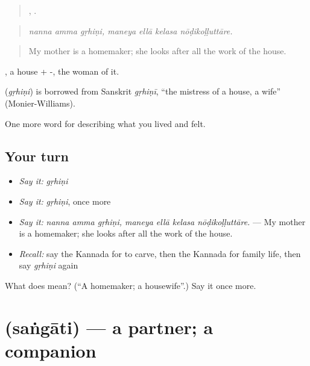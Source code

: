 \begin{quote}
  ,    .
\end{quote}

\begin{quote}
\emph{nanna amma gṛhiṇi, maneya ellā kelasa nōḍikoḷḷuttāre.}
\end{quote}

\begin{quote}
My mother is a homemaker; she looks after all the work of the house.
\end{quote}

, a house + -, the woman of it.

\begin{cousinweb}
\textbf{} (\emph{gṛhiṇi}) is borrowed from Sanskrit \emph{gṛhiṇī}, \textquotedblleft{}the mistress of a house, a wife\textquotedblright{} (Monier-Williams).
\end{cousinweb}

\begin{grammarlens}[title={What you've built}]
One more word for describing what you lived and felt.
\end{grammarlens}

\subsection*{Your turn}
\begin{itemize}
\raggedright
  \item \emph{Say it:} \emph{gṛhiṇi}
  \item \emph{Say it:} \emph{gṛhiṇi}, once more
  \item \emph{Say it:} \emph{nanna amma gṛhiṇi, maneya ellā kelasa nōḍikoḷḷuttāre.} — My mother is a homemaker; she looks after all the work of the house.
  \item \emph{Recall:} say the Kannada for to carve, then the Kannada for family life, then say \emph{gṛhiṇi} again
\end{itemize}

\begin{tcolorbox}[breakable,colback=teal!4,colframe=teal!35!black,title={Before you move on}]
What does  mean? (\textquotedblleft{}A homemaker; a housewife\textquotedblright{}.) Say it once more.
\end{tcolorbox}
\section[\texorpdfstring{\kn{ಸಂಗಾತಿ} (saṅgāti)}{ಸಂಗಾತಿ (saṅgāti)}]{ (saṅgāti) — a partner; a companion}

